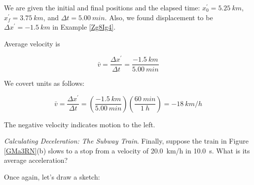 \documentclass[../../main-ap-physics.tex]{subfiles}
\begin{document}
We are given the initial and final positions and the elapsed time: $x_0^{\prime} = \SI{5.25}{km}$, $x_f^{\prime} = \SI{3.75}{km}$, and $\Delta t = \SI{5.00}{min}$. Also, we found displacement to be $\Delta x^{\prime} = -\SI{1.5}{km}$ in Example \ref{Zg8Ig4}. 

\vspace{1em}

Average velocity is

\begin{equation*}
    \bar{v} = \frac{\Delta x^{\prime}}{\Delta t} = \frac{-\SI{1.5}{km}}{\SI{5.00}{min}} 
\end{equation*}

We covert units as follows:

\begin{equation*}
    \bar{v} = \frac{\Delta x^{\prime}}{\Delta t} = \left(\frac{-\SI{1.5}{km}}{\SI{5.00}{min}}\right)
        \left(\frac{\SI{60}{min}}{\SI{1}{h}}\right) = -\SI{18}{km/h}
\end{equation*}

The negative velocity indicates motion to the left.

\endsolution

\begin{example} \label{2453yE}
    \textit{Calculating Deceleration: The Subway Train}. Finally, suppose the train in Figure \ref{GMa3RN}(b) slows to a stop from a velocity of \SI{20.0}{km/h} in \SI{10.0}{s}. What is its average acceleration?
\end{example}

\Solution Once again, let's draw a sketch:

\begin{center}
\end{center}
\end{document}
